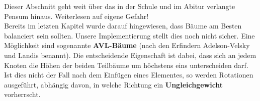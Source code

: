 \documentclass{article}
\begin{document}
Dieser Abschnitt geht weit über das in der Schule und im Abitur verlangte Pensum hinaus. Weiterlesen auf eigene Gefahr! \\
Bereits im letzten Kapitel wurde darauf hingewiesen, dass Bäume am Besten balanciert sein sollten. Unsere Implementierung stellt dies noch nicht sicher. Eine Möglichkeit sind sogenannte \textbf{AVL-Bäume} (nach den Erfindern Adelson-Velsky und Landis benannt). Die entscheidende Eigenschaft ist dabei, dass sich an jedem Knoten die Höhen der beiden Teilbäume um höchstens eins unterscheiden darf. \\
Ist dies nicht der Fall nach dem Einfügen eines Elementes, so werden Rotationen ausgeführt, abhängig davon, in welche Richtung ein \textbf{Ungleichgewicht} vorherrscht. 
\end{document}
